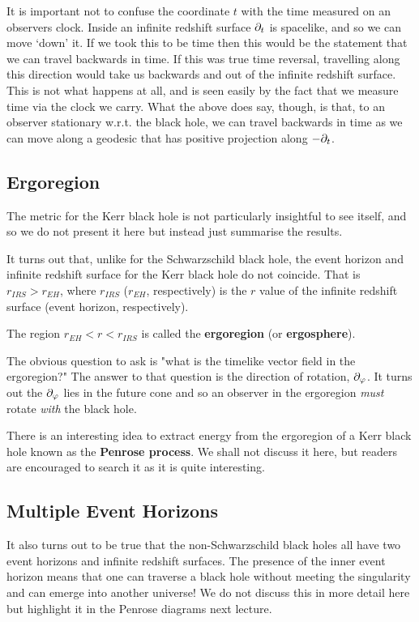 \br 
    It is important not to confuse the coordinate $t$ with the time measured on an observers clock. Inside an infinite redshift surface $\partial_t$ is spacelike, and so we can move `down' it. If we took this to be time then this would be the statement that we can travel backwards in time. If this was true time reversal, travelling along this direction would take us backwards and out of the infinite redshift surface. This is not what happens at all, and is seen easily by the fact that we measure time via the clock we carry. What the above does say, though, is that, to an observer stationary w.r.t. the black hole, we can travel backwards in time as we can move along a geodesic that has positive projection along $-\partial_t$. 
\er 

\subsection{Ergoregion}

The metric for the Kerr black hole is not particularly insightful to see itself, and so we do not present it here but instead just summarise the results. 

It turns out that, unlike for the Schwarzschild black hole, the event horizon and infinite redshift surface for the Kerr black hole do not coincide. That is $r_{IRS}>r_{EH}$, where $r_{IRS}$ ($r_{EH}$, respectively) is the $r$ value of the infinite redshift surface (event horizon, respectively). 

\bd[Ergoregion]
    The region $r_{EH} < r < r_{IRS}$ is called the \textbf{ergoregion} (or \textbf{ergosphere}).
\ed 

The obvious question to ask is "what is the timelike vector field in the ergoregion?" The answer to that question is the direction of rotation, $\partial_{\varphi}$. It turns out the $\partial_{\varphi}$ lies in the future cone and so an observer in the ergoregion \textit{must} rotate \textit{with} the black hole. 

\br 
    There is an interesting idea to extract energy from the ergoregion of a Kerr black hole known as the \textbf{Penrose process}. We shall not discuss it here, but readers are encouraged to search it as it is quite interesting.
\er 

\subsection{Multiple Event Horizons}

It also turns out to be true that the non-Schwarzschild black holes all have two event horizons and infinite redshift surfaces. The presence of the inner event horizon means that one can traverse a black hole without meeting the singularity and can emerge into another universe! We do not discuss this in more detail here but highlight it in the Penrose diagrams next lecture. 
